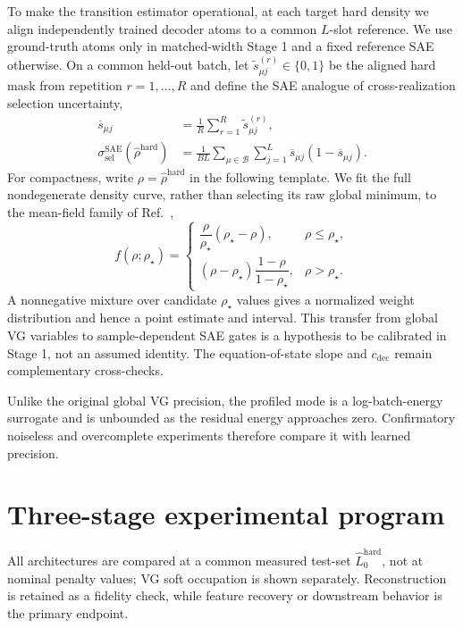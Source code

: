 \documentclass[aps,pre,reprint,superscriptaddress,amsmath,amssymb,nofootinbib]{revtex4-2}
\begin{document}
To make the transition estimator operational, at each target hard density we
align independently trained decoder atoms to a common $L$-slot reference.  We
use ground-truth atoms only in matched-width Stage 1 and a fixed reference SAE
otherwise.  On a common held-out batch, let
$\widetilde s^{(r)}_{\mu j}\in\{0,1\}$ be the aligned hard mask from repetition
$r=1,\ldots,R$ and define the SAE analogue of cross-realization selection
uncertainty,
\begin{align}
 \overline s_{\mu j}&=\frac1R\sum_{r=1}^{R}\widetilde s^{(r)}_{\mu j},\\
 \sigma_{\mathrm{sel}}^{\mathrm{SAE}}(\widehat\rho^{\mathrm{hard}})
 &=\frac1{BL}\sum_{\mu\in\mathcal B}\sum_{j=1}^{L}
 \overline s_{\mu j}(1-\overline s_{\mu j}).
 \label{eq:sae-selection-uncertainty}
\end{align}
For compactness, write $\rho=\widehat\rho^{\mathrm{hard}}$ in the following
template.  We fit the full nondegenerate density curve, rather than selecting its raw
global minimum, to the mean-field family of Ref.~\cite{soh2025variational},
\begin{equation}
 f(\rho;\rho_\star)=
 \begin{cases}
 \dfrac{\rho}{\rho_\star}(\rho_\star-\rho),&\rho\leq\rho_\star,\\[4pt]
 (\rho-\rho_\star)\dfrac{1-\rho}{1-\rho_\star},&\rho>\rho_\star.
 \end{cases}
 \label{eq:mean-field-template}
\end{equation}
A nonnegative mixture over candidate $\rho_\star$ values gives a normalized
weight distribution and hence a point estimate and interval.  This transfer
from global VG variables to sample-dependent SAE gates is a hypothesis to be
calibrated in Stage 1, not an assumed identity.  The equation-of-state slope
and $c_{\mathrm{dec}}$ remain complementary cross-checks.

Unlike the original global VG precision, the profiled mode is a
log-batch-energy surrogate and is unbounded as the residual energy approaches
zero.  Confirmatory noiseless and overcomplete experiments therefore compare
it with learned precision.

\section{Three-stage experimental program}
\label{sec:experiments}

All architectures are compared at a common measured test-set
$\widehat L_0^{\mathrm{hard}}$, not at nominal penalty values; VG soft
occupation is shown separately.
Reconstruction is retained as a fidelity check, while feature recovery or
downstream behavior is the primary endpoint.
\end{document}

